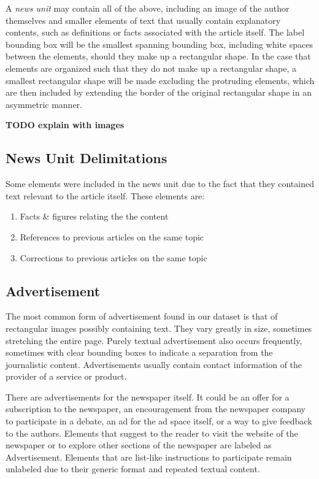 \documentclass[english, bibtex]{kththesis}
\begin{document}
A \textit{news unit} may contain all of the above, including an image of the author themselves and smaller elements of text that usually contain explanatory contents, such as definitions or facts associated with the article itself. The label bounding box will be the smallest spanning bounding box, including white spaces between the elements, should they make up a rectangular shape. In the case that elements are organized such that they do not make up a rectangular shape, a smallest rectangular shape will be made excluding the protruding elements, which are then included by extending the border of the original rectangular shape in an asymmetric manner.

\textbf{TODO explain with images}

\subsection{News Unit Delimitations}

Some elements were included in the news unit due to the fact that they contained text relevant to the article itself. These elements are:

\begin{enumerate}
\item Facts \& figures relating the the content
\item References to previous articles on the same topic
\item Corrections to previous articles on the same topic
\end{enumerate}

\subsection{Advertisement}

The most common form of advertisement found in our dataset is that of rectangular images possibly containing text. They vary greatly in size, sometimes stretching the entire page. Purely textual advertisement also occurs frequently, sometimes with clear bounding boxes to indicate a separation from the journalistic content. Advertisements usually contain contact information of the provider of a service or product. 

There are advertisements for the newspaper itself. It could be an offer for a subscription to the newspaper, an encouragement from the newspaper company to participate in a debate, an ad for the ad space itself, or a way to give feedback to the authors. Elements that suggest to the reader to visit the website of the newspaper or to explore other sections of the newspaper are labeled as Advertisement. Elements that are list-like instructions to participate remain unlabeled due to their generic format and repeated textual content.
\end{document}
